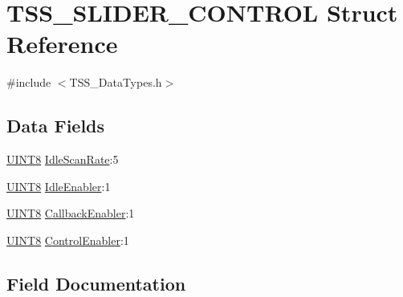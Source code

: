 \hypertarget{struct_t_s_s___s_l_i_d_e_r___c_o_n_t_r_o_l}{}\section{T\+S\+S\+\_\+\+S\+L\+I\+D\+E\+R\+\_\+\+C\+O\+N\+T\+R\+OL Struct Reference}
\label{struct_t_s_s___s_l_i_d_e_r___c_o_n_t_r_o_l}


{\ttfamily \#include $<$T\+S\+S\+\_\+\+Data\+Types.\+h$>$}

\subsection*{Data Fields}
\begin{DoxyCompactItemize}
\item 
\hyperlink{_t_s_s___data_types_8h_ab27e9918b538ce9d8ca692479b375b6a}{U\+I\+N\+T8} \hyperlink{struct_t_s_s___s_l_i_d_e_r___c_o_n_t_r_o_l_a99c7b7e52704391b686df20f28596c3d}{Idle\+Scan\+Rate}\+:5
\item 
\hyperlink{_t_s_s___data_types_8h_ab27e9918b538ce9d8ca692479b375b6a}{U\+I\+N\+T8} \hyperlink{struct_t_s_s___s_l_i_d_e_r___c_o_n_t_r_o_l_aa5bc869699904b94a79c7e91a79e82f4}{Idle\+Enabler}\+:1
\item 
\hyperlink{_t_s_s___data_types_8h_ab27e9918b538ce9d8ca692479b375b6a}{U\+I\+N\+T8} \hyperlink{struct_t_s_s___s_l_i_d_e_r___c_o_n_t_r_o_l_a88735799df711ea15d1e1fefc41a8e89}{Callback\+Enabler}\+:1
\item 
\hyperlink{_t_s_s___data_types_8h_ab27e9918b538ce9d8ca692479b375b6a}{U\+I\+N\+T8} \hyperlink{struct_t_s_s___s_l_i_d_e_r___c_o_n_t_r_o_l_af8b1f79b81dd202b28e3ff059c5be194}{Control\+Enabler}\+:1
\end{DoxyCompactItemize}


\subsection{Field Documentation}
\mbox{\label{struct_t_s_s___s_l_i_d_e_r___c_o_n_t_r_o_l_a88735799df711ea15d1e1fefc41a8e89}} 
